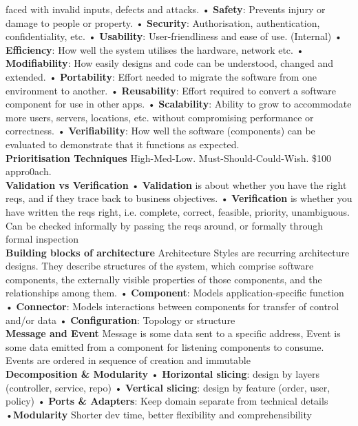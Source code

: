 \documentclass[10pt, landscape]{article}
\begin{document}
\begin{multicols}{4}
faced with invalid inputs, defects and attacks.
• \textbf{Safety}: Prevents injury or damage to people or property.
• \textbf{Security}: Authorisation, authentication, confidentiality, etc.
• \textbf{Usability}: User-friendliness and ease of use.
(Internal)
• \textbf{Efficiency}: How well the system utilises the hardware,
network etc.
• \textbf{Modifiability}: How easily designs and code can be understood, changed and extended.
• \textbf{Portability}: Effort needed to migrate the software
from one environment to another.
• \textbf{Reusability}: Effort required to convert a software
component for use in other apps.
• \textbf{Scalability}: Ability to grow to accommodate more users, servers, locations, etc. without compromising performance or correctness.
• \textbf{Verifiability}: How well the software (components) can be evaluated to demonstrate that it functions as expected. \\

\textbf{Prioritisation Techniques} High-Med-Low. Must-Should-Could-Wish. \$100 appro0ach. \\

\textbf{Validation vs Verification} • \textbf{Validation} is about whether you have the right reqs, and if they trace back to business objectives. • \textbf{Verification} is whether you have written the reqs right, i.e. complete, correct, feasible, priority, unambiguous. Can be checked informally by passing the reqs
around, or formally through formal inspection\\

\textbf{Building blocks of architecture}
Architecture Styles are recurring architecture designs. They describe structures of the system, which comprise software components, the externally visible properties of those components, and the relationships among them.
• \textbf{Component}: Models application-specific function
• \textbf{Connector}: Models interactions between components for transfer of control and/or data
• \textbf{Configuration}: Topology or structure \\

\textbf{Message and Event} Message is some data sent to a specific address, Event is some data emitted from a component for listening components to consume. Events are ordered in sequence of creation and immutable \\ 

\textbf{Decomposition \& Modularity}  • \textbf{Horizontal slicing}: design by layers (controller, service, repo)
• \textbf{Vertical slicing}: design by feature (order, user, policy)
• \textbf{Ports \& Adapters}: Keep domain separate from technical details •\textbf{Modularity} Shorter dev time, better flexibility and comprehensibility \\ 


\end{multicols}
\end{document}
